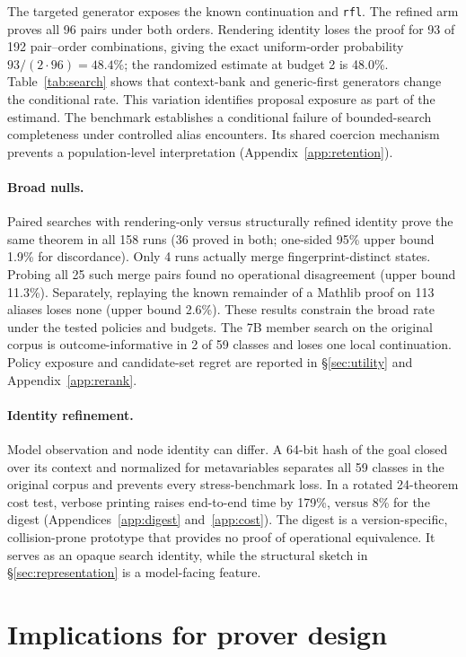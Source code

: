 \documentclass[11pt]{article}
\begin{document}
The targeted generator exposes the known continuation and \texttt{rfl}. The
refined arm proves all 96 pairs under both orders. Rendering identity loses the
proof for 93 of 192 pair--order combinations, giving the exact uniform-order
probability $93/(2\cdot96)=48.4\%$; the randomized estimate at budget 2 is
48.0\%. Table~\ref{tab:search} shows that context-bank and generic-first
generators change the conditional rate. This variation identifies proposal
exposure as part of the estimand. The benchmark establishes a conditional
failure of bounded-search completeness under controlled alias encounters. Its shared
coercion mechanism prevents a population-level interpretation
(Appendix~\ref{app:retention}).

\paragraph{Broad nulls.}
Paired searches with rendering-only versus structurally refined identity prove
the same theorem in all 158 runs (36 proved in both; one-sided 95\% upper bound
1.9\% for discordance). Only 4 runs actually merge fingerprint-distinct
states. Probing all 25 such merge pairs found no operational disagreement
(upper bound 11.3\%). Separately, replaying the known remainder of a Mathlib
proof on 113 aliases loses none (upper bound 2.6\%). These results constrain
the broad rate under the tested policies and budgets. The 7B member search on
the original corpus is outcome-informative in 2 of 59 classes and loses one local
continuation. Policy exposure and candidate-set regret are reported in
\S\ref{sec:utility} and Appendix~\ref{app:rerank}.

\paragraph{Identity refinement.}
Model observation and node identity can differ. A 64-bit hash of the
goal closed over its context and normalized for metavariables separates all 59
classes in the original corpus and prevents every stress-benchmark loss. In a
rotated 24-theorem
cost test, verbose printing raises end-to-end time by 179\%, versus 8\% for the
digest (Appendices~\ref{app:digest} and~\ref{app:cost}). The digest is a
version-specific, collision-prone prototype that provides no proof of
operational equivalence. It serves as an opaque search identity, while the
structural sketch in \S\ref{sec:representation} is a model-facing feature.

\section{Implications for prover design}
\end{document}
